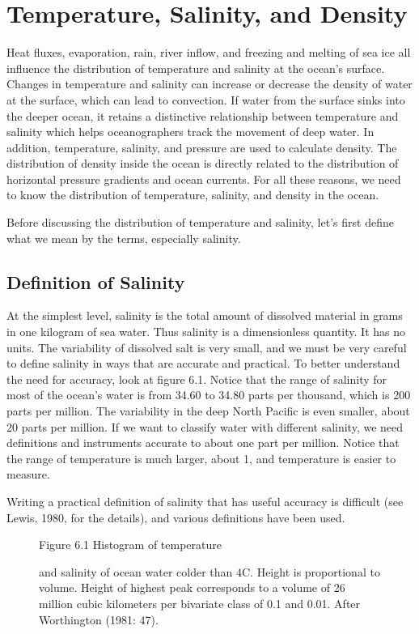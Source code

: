 \chapter{Temperature, Salinity, and Density}
Heat fluxes, evaporation, rain, river inflow, and freezing and melting of sea
ice all influence the distribution of temperature and salinity at the ocean's
surface. Changes in temperature and salinity can increase or decrease the density
of water at the surface, which can lead to convection. If water from the
surface sinks into the deeper ocean, it retains a distinctive relationship between
temperature and salinity which helps oceanographers track the movement of deep
water. In addition, temperature, salinity, and pressure are used to calculate
density. The distribution of density inside the ocean is directly related to the
distribution of horizontal pressure gradients and ocean currents.  For all these
reasons, we need to know the distribution of temperature, salinity, and density in
the ocean.

Before discussing the distribution of temperature and salinity, let's first define
what we mean by the terms, especially salinity.

\section{Definition of Salinity}
At the simplest level, salinity is the total
amount of dissolved material in grams in one kilogram of sea
water. Thus salinity is a dimensionless quantity. It has no units. The
variability of dissolved salt is very small, and we must be very
careful to define salinity in ways that are accurate and practical. To
better understand the need for accuracy, look
at figure 6.1. Notice that the range of salinity for most of the
ocean's water is from 34.60 to 34.80 parts per thousand, which is 200
parts per million. The variability in the deep North Pacific is even
smaller, about 20 parts per million. If we want to classify water with
different salinity, we need definitions and instruments accurate to
about one part per million. Notice that the range of temperature is
much larger, about 1, and temperature is easier to measure.

Writing a practical definition of salinity that has useful accuracy is
difficult (see Lewis, 1980, for the details), and various definitions
have been used.\\

\begin{figure}[t!]
\footnotesize
Figure 6.1 Histogram of temperature \rule{0mm}{3ex}and salinity of
ocean water colder than 4\degrees C. Height is proportional to
volume. Height of highest peak corresponds to a volume of 26 million
cubic kilometers per bivariate class of 0.1 and 0.01. After
Worthington (1981: 47).
\label{fig:salhistogram}
\vspace{-3ex}
\end{figure}

